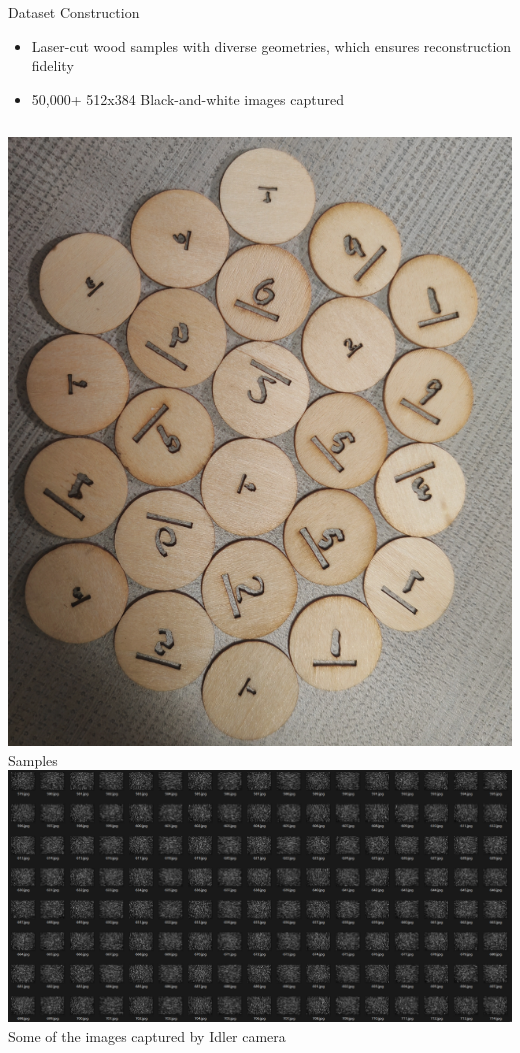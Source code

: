 \documentclass{beamer}
\begin{document}
\begin{frame}{Dataset Construction}

        \begin{itemize}
                \item Laser-cut wood samples with diverse geometries, which ensures reconstruction fidelity
                \item 50,000+ 512x384 Black-and-white images captured
        \end{itemize}
        \begin{columns}
            \includegraphics[width=0.95\linewidth]{samples.png}
            \small{Samples}
            \includegraphics[width=0.95\linewidth]{image.png}
            \small{Some of the images captured by Idler camera}
        \end{columns}
\end{frame}
\end{document}
